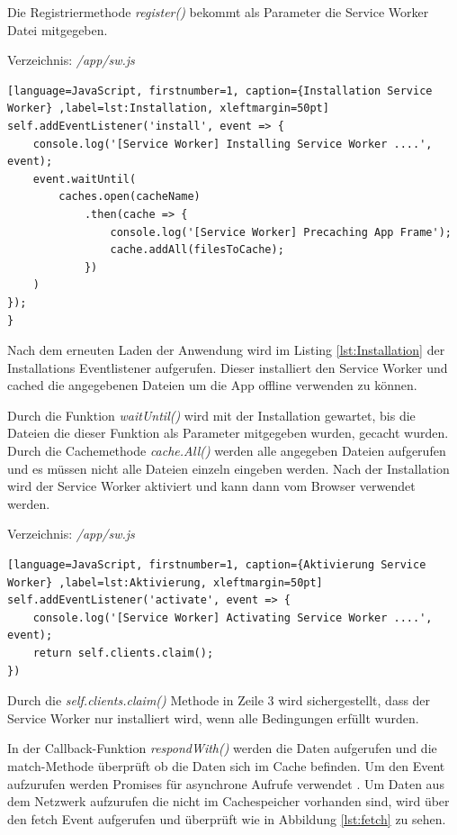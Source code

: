 \clearpage
Die Registriermethode \textit{register()} bekommt als Parameter die Service Worker Datei mitgegeben.

Verzeichnis: \textit{/app/sw.js}

\begin{lstlisting}[language=JavaScript, firstnumber=1, caption={Installation Service Worker} ,label=lst:Installation, xleftmargin=50pt]
self.addEventListener('install', event => {
    console.log('[Service Worker] Installing Service Worker ....', event);
    event.waitUntil(
        caches.open(cacheName)
            .then(cache => {
                console.log('[Service Worker] Precaching App Frame');
                cache.addAll(filesToCache);
            })
    )
});
}
\end{lstlisting}

Nach dem erneuten Laden der Anwendung wird im Listing \ref{lst:Installation} der Installations Eventlistener aufgerufen. Dieser installiert den Service Worker und cached die angegebenen Dateien um die App offline verwenden zu können. 

Durch die Funktion \textit{waitUntil()} wird mit der Installation gewartet, bis die Dateien die dieser Funktion als Parameter mitgegeben wurden, gecacht wurden. Durch die Cachemethode \textit{cache.All()} werden alle angegeben Dateien aufgerufen und es müssen nicht alle Dateien einzeln eingeben werden.
Nach der Installation wird der Service Worker aktiviert und kann dann vom Browser verwendet werden.

Verzeichnis: \textit{/app/sw.js}

\begin{lstlisting}[language=JavaScript, firstnumber=1, caption={Aktivierung Service Worker} ,label=lst:Aktivierung, xleftmargin=50pt]
self.addEventListener('activate', event => {
    console.log('[Service Worker] Activating Service Worker ....', event);
    return self.clients.claim();
})
\end{lstlisting}

Durch die \textit{self.clients.claim()} Methode in Zeile 3 wird sichergestellt, dass der Service Worker nur installiert wird, wenn alle Bedingungen erfüllt wurden.

In der Callback-Funktion \textit{respondWith()} werden die Daten aufgerufen und die \\match-Methode überprüft ob die Daten sich im Cache befinden.
Um den Event aufzurufen werden Promises für asynchrone Aufrufe verwendet .
Um Daten aus dem Netzwerk aufzurufen die nicht im Cachespeicher vorhanden sind, wird über den fetch Event aufgerufen und überprüft wie in Abbildung \ref{lst:fetch} zu sehen.

